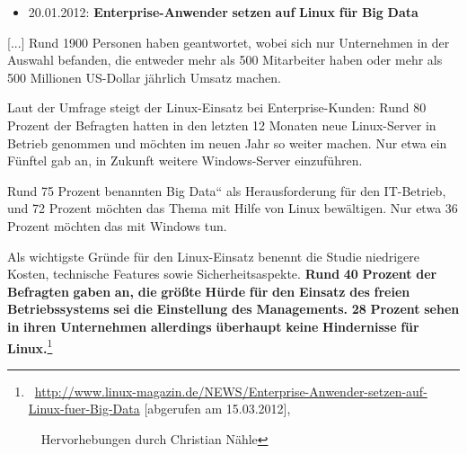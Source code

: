 \documentclass[a4paper]{article}
\newcommand\liststyleWWviiiNumiii{%
\renewcommand\theenumi{\arabic{enumi}}
\renewcommand\theenumii{\arabic{enumii}}
\renewcommand\theenumiii{\arabic{enumiii}}
\renewcommand\labelitemi{{}-}
\renewcommand\labelenumi{\theenumi.}
\renewcommand\labelenumii{\theenumii.}
\renewcommand\labelenumiii{\theenumiii.}
}
\begin{document}
\bigskip

\liststyleWWviiiNumiii
\begin{itemize}
\item {
20.01.2012: {\guillemotright}\textbf{Enterprise-Anwender}\textbf{
}\textbf{setzen}\textbf{ }\textbf{auf}\textbf{ }\textbf{Linux}\textbf{
}\textbf{f\"ur}\textbf{ }\textbf{Big}\textbf{ }\textbf{Data}}
\end{itemize}
{
[...] Rund 1900 Personen haben geantwortet, wobei sich nur Unternehmen
in der Auswahl befanden, die entweder mehr als 500 Mitarbeiter haben
oder mehr als 500 Millionen US{}-Dollar j\"ahrlich Umsatz machen.}

{
Laut der Umfrage steigt der Linux-Einsatz bei Enterprise-Kunden: Rund 80
Prozent der Befragten hatten in den letzten 12 Monaten neue
Linux-Server in Betrieb genommen und m\"ochten im neuen Jahr so weiter
machen. Nur etwa ein F\"unftel gab an, in Zukunft weitere
Windows-Server einzuf\"uhren.}

{
Rund 75 Prozent benannten {\quotedblbase}Big Data{\textquotedblleft} als
Herausforderung f\"ur den IT-Betrieb, und 72 Prozent m\"ochten das
Thema mit Hilfe von Linux bew\"altigen. Nur etwa 36 Prozent m\"ochten
das mit Windows tun.}

{
Als wichtigste Gr\"unde f\"ur den Linux-Einsatz benennt die Studie
niedrigere Kosten, technische Features sowie Sicherheitsaspekte.
\textbf{Rund}\textbf{ }\textbf{40}\textbf{ }\textbf{Prozent}\textbf{
}\textbf{der}\textbf{ }\textbf{Befragten}\textbf{
}\textbf{gaben}\textbf{ }\textbf{an,}\textbf{ }\textbf{die}\textbf{
}\textbf{gr\"o{\ss}te}\textbf{ }\textbf{H\"urde}\textbf{
}\textbf{f\"ur}\textbf{ }\textbf{den}\textbf{ }\textbf{Einsatz}\textbf{
}\textbf{des}\textbf{ }\textbf{freien}\textbf{
}\textbf{Betriebssystems}\textbf{ }\textbf{sei}\textbf{
}\textbf{die}\textbf{ }\textbf{Einstellung}\textbf{
}\textbf{des}\textbf{ }\textbf{Managements.}\textbf{
}\textbf{28}\textbf{ }\textbf{Prozent}\textbf{ }\textbf{sehen}\textbf{
}\textbf{in}\textbf{ }\textbf{ihren}\textbf{
}\textbf{Unternehmen}\textbf{ }\textbf{allerdings}\textbf{
}\textbf{\"uberhaupt}\textbf{ }\textbf{keine}\textbf{
}\textbf{Hindernisse}\textbf{ }\textbf{f\"ur}\textbf{
}\textbf{Linux.}{\guillemotleft}\footnote{\ \url{http://www.linux-magazin.de/NEWS/Enterprise-Anwender-setzen-auf-Linux-fuer-Big-Data}
[abgerufen am 15.03.2012],\par \ \ Hervorhebungen durch Christian
N\"ahle}}
\end{document}
